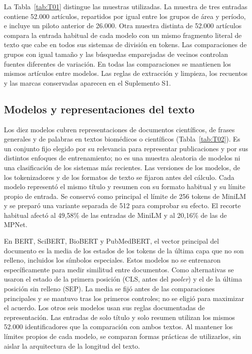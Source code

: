 \documentclass[12pt]{article}
\begin{document}
La Tabla~\ref{tab:T01} distingue las muestras utilizadas. La muestra de tres entradas contiene 52.000 artículos, repartidos por igual entre los grupos de área y período, e incluye un piloto anterior de 26.000. Otra muestra distinta de 52.000 artículos compara la entrada habitual de cada modelo con un mismo fragmento literal de texto que cabe en todos sus sistemas de división en tokens. Las comparaciones de grupos con igual tamaño y las búsquedas emparejadas de vecinos controlan fuentes diferentes de variación. En todas las comparaciones se mantienen los mismos artículos entre modelos. Las reglas de extracción y limpieza, los recuentos y las marcas conservadas aparecen en el Suplemento S1.


\subsection{Modelos y representaciones del texto}
Los diez modelos cubren representaciones de documentos científicos, de frases generales y de palabras en textos biomédicos o científicos (Tabla~\ref{tab:T02}). Es un conjunto fijo elegido por su relevancia para representar publicaciones y por sus distintos enfoques de entrenamiento; no es una muestra aleatoria de modelos ni una clasificación de los sistemas más recientes. Las versiones de los modelos, de los tokenizadores y de los formatos de texto se fijaron antes del cálculo. Cada modelo representó el mismo título y resumen con su formato habitual y su límite propio de entrada. Se conservó como principal el límite de 256 tokens de MiniLM y se preparó una variante separada de 512 para comprobar su efecto. El recorte habitual afectó al 49,58\% de las entradas de MiniLM y al 20,16\% de las de MPNet.

En BERT, SciBERT, BioBERT y PubMedBERT, el vector principal del documento es la media de los estados de los tokens de la última capa que no son relleno, incluidos los símbolos especiales. Estos modelos no se entrenaron específicamente para medir similitud entre documentos. Como alternativas se usaron el estado de la primera posición (CLS, antes del \emph{pooler}) y el de la última posición sin relleno (SEP). La media se fijó antes de las comparaciones principales y se mantuvo tras los primeros controles; no se eligió para maximizar el acuerdo. Los otros seis modelos usan sus reglas documentadas de representación. Las entradas de solo título y solo resumen utilizan los mismos 52.000 identificadores que la comparación con ambos textos. Al mantener los límites propios de cada modelo, se comparan formas prácticas de utilizarlos, sin aislar la arquitectura de la longitud del texto.

\end{document}
